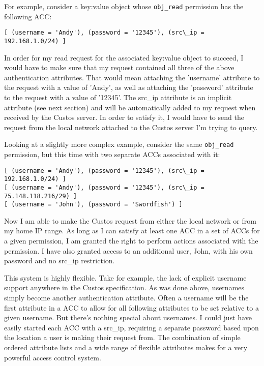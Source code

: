 For example, consider a key:value object whose \texttt{obj\_read}
permission has the following ACC:

\begin{Verbatim}[samepage=true]
[ (username = 'Andy'), (password = '12345'), (src\_ip = 192.168.1.0/24) ]
\end{Verbatim}

In order for my read request for the associated key:value object to
succeed, I would have to make sure that my request contained all three
of the above authentication attributes. That would mean attaching the
'username' attribute to the request with a value of 'Andy', as well as
attaching the 'password' attribute to the request with a value of
'12345'. The src\_ip attribute is an implicit attribute (see next
section) and will be automatically added to my request when received by
the Custos server. In order to satisfy it, I would have to send the
request from the local network attached to the Custos server I'm
trying to query.

Looking at a slightly more complex example, consider the same
\texttt{obj\_read} permission, but this time with two separate ACCs
associated with it:

\begin{Verbatim}[samepage=true]
[ (username = 'Andy'), (password = '12345'), (src\_ip = 192.168.1.0/24) ]
[ (username = 'Andy'), (password = '12345'), (src\_ip = 75.148.118.216/29) ]
[ (username = 'John'), (password = 'Swordfish') ]
\end{Verbatim}

Now I am able to make the Custos request from either the local network
or from my home IP range. As long as I can satisfy at least one ACC in
a set of ACCs for a given permission, I am granted the right to
perform actions associated with the permission. I have also granted
access to an additional user, John, with his own password and no
src\_ip restriction.

This system is highly flexible. Take for example, the lack of explicit
username support anywhere in the Custos specification. As was done
above, usernames simply become another authentication attribute. Often
a username will be the first attribute in a ACC to allow for all
following attributes to be set relative to a given username. But
there's nothing special about usernames. I could just have easily
started each ACC with a src\_ip, requiring a separate password based
upon the location a user is making their request from. The combination
of simple ordered attribute lists and a wide range of flexible
attributes makes for a very powerful access control system.

